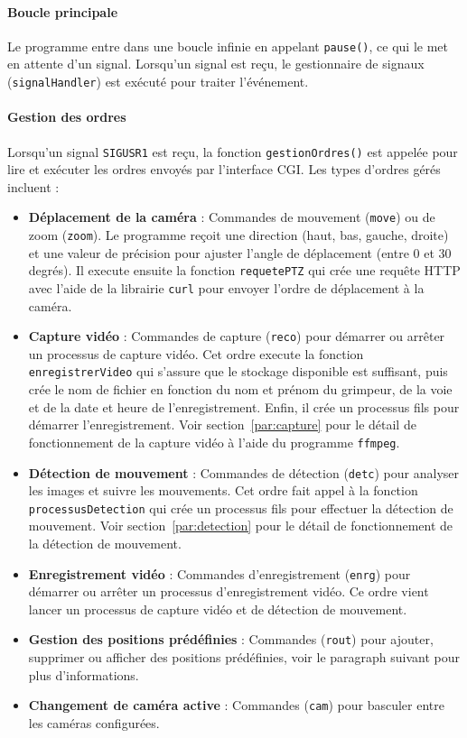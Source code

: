 \documentclass[a4paper, 11pt, french]{article}
\begin{document}
\paragraph{Boucle principale}
Le programme entre dans une boucle infinie en appelant \texttt{pause()}, ce qui le met en attente d'un signal. Lorsqu'un signal est reçu, le gestionnaire de signaux (\texttt{signalHandler}) est exécuté pour traiter l'événement.

\paragraph{Gestion des ordres}
Lorsqu'un signal \texttt{SIGUSR1} est reçu, la fonction \texttt{gestionOrdres()} est appelée pour lire et exécuter les ordres envoyés par l'interface CGI. Les types d'ordres gérés incluent :
\begin{itemize}
    \item \textbf{Déplacement de la caméra} : Commandes de mouvement (\texttt{move}) ou de zoom (\texttt{zoom}). Le programme reçoit une direction (haut, bas, gauche, droite) et une valeur de précision pour ajuster l'angle de déplacement (entre 0 et 30 degrés). Il execute ensuite la fonction \texttt{requetePTZ} qui crée une requête HTTP avec l'aide de la librairie \texttt{curl} pour envoyer l'ordre de déplacement à la caméra.
    \item \textbf{Capture vidéo} : Commandes de capture (\texttt{reco}) pour démarrer ou arrêter un processus de capture vidéo. Cet ordre execute la fonction \texttt{enregistrerVideo} qui s'assure que le stockage disponible est suffisant, puis crée le nom de fichier en fonction du nom et prénom du grimpeur, de la voie et de la date et heure de l'enregistrement. Enfin, il crée un processus fils pour démarrer l'enregistrement. Voir section~\ref{par:capture} pour le détail de fonctionnement de la capture vidéo à l'aide du programme \texttt{ffmpeg}.
    \item \textbf{Détection de mouvement} : Commandes de détection (\texttt{detc}) pour analyser les images et suivre les mouvements. Cet ordre fait appel à la fonction \texttt{processusDetection} qui crée un processus fils pour effectuer la détection de mouvement. Voir section~\ref{par:detection} pour le détail de fonctionnement de la détection de mouvement.
    \item \textbf{Enregistrement vidéo} : Commandes d'enregistrement (\texttt{enrg}) pour démarrer ou arrêter un processus d'enregistrement vidéo. Ce ordre vient lancer un processus de capture vidéo et de détection de mouvement.
    \item \textbf{Gestion des positions prédéfinies} : Commandes (\texttt{rout}) pour ajouter, supprimer ou afficher des positions prédéfinies, voir le paragraph suivant pour plus d'informations.
    \item \textbf{Changement de caméra active} : Commandes (\texttt{cam}) pour basculer entre les caméras configurées.
\end{itemize}
\end{document}
